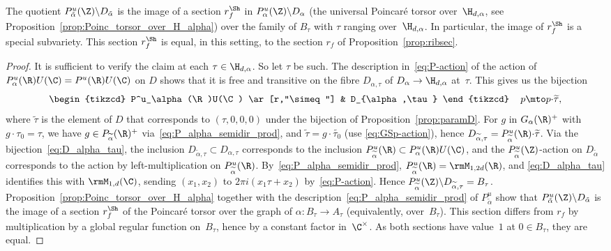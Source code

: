 \begin{Theorem}\label{thm:RibetsectionMSV}
The quotient $P_{\tilde{\alpha}}^u(\Z)\backslash D_{\tilde{\alpha}}$
is the image of a section $r^\Sh_f$ in $P_\alpha^u(\Z)\backslash
D_\alpha$ (the universal Poincaré torsor over~$\H_{d,\alpha}$, see
Proposition~\ref{prop:Poinc_torsor_over_H_alpha}) over the family of
$B_\tau$ with $\tau$ ranging over~$\H_{d,\alpha}$. In particular,
the image of $r^\Sh_f$ is a special subvariety. This section $r^\Sh_f$
is equal, in this setting, to the section $r_f$ of
Proposition~\ref{prop:ribsec}.
\end{Theorem}
\begin{proof}
It is sufficient to verify the claim at each
$\tau\in\H_{d,\alpha}$. So let $\tau$ be such. The description
in~\eqref{eq:P-action} of the action of
$P^u_\alpha(\R)U(\C)=P^u(\R)U(\C)$ on $D$ shows that it is free and
transitive on the fibre $D_{\alpha,\tau}$ of
$D_\alpha\to\H_{d,\alpha}$ at~$\tau$. This gives us the bijection
\begin{equation}\label{eq:D_alpha_tau}
\begin{tikzcd}
P^u_\alpha(\R)U(\C) \ar[r,"\simeq"] & D_{\alpha,\tau}
\end{tikzcd}\,\quad
p\mto p{\cdot}\widetilde{\tau},
\end{equation}
where $\widetilde{\tau}$ is the element of $D$ that corresponds to
$(\tau,0,0,0)$ under the bijection of Proposition~\ref{prop:paramD}.
For $g$ in $G_\alpha(\R)^+$ with $g{\cdot}\tau_0=\tau$, we have $g\in
P_{\widetilde{\alpha}}(\R)^+$ via~\eqref{eq:P_alpha_semidir_prod}, and
$\widetilde{\tau}=g{\cdot}\widetilde{\tau_0}$ (use
\eqref{eq:GSp-action}), hence
$D_{\widetilde{\alpha},\tau}=P^u_{\widetilde{\alpha}}(\R){\cdot}\widetilde{\tau}$.
Via the bijection~\eqref{eq:D_alpha_tau}, the inclusion
$D_{\widetilde{\alpha},\tau}\subset D_{\alpha,\tau}$ corresponds to
the inclusion $P^u_{\widetilde{\alpha}}(\R)\subset
P^u_\alpha(\R)U(\C)$, and the $P^u_{\widetilde{\alpha}}(\Z)$-action on
$D_{\tilde{\alpha}}$ corresponds to the action by left-multiplication
on $P^u_{\widetilde{\alpha}}(\R)$. By~\eqref{eq:P_alpha_semidir_prod},
$P^u_{\widetilde{\alpha}}(\R)=\rmM_{1,2d}(\R)$, and
\eqref{eq:D_alpha_tau} identifies this with $\rmM_{1,d}(\C)$, sending
$(x_1,x_2)$ to $2\pi i(x_1\tau + x_2)$ by~\eqref{eq:P-action}. Hence
$P_{\widetilde{\alpha}}^u(\Z)\backslash
D_{\widetilde{\alpha},\tau}=B_\tau$.
Proposition~\ref{prop:Poinc_torsor_over_H_alpha} together with the
description~\eqref{eq:P_alpha_semidir_prod} of
$P_{\widetilde{\alpha}}^u$ show that
$P_{\tilde{\alpha}}^u(\Z)\backslash D_{\tilde{\alpha}}$ is the image
of a section $r^\Sh_f$ of the Poincaré torsor over the graph of
$\alpha\colon B_\tau\to A_\tau$ (equivalently, over~$B_\tau$). This
section differs from $r_f$ by multiplication by a global regular
function on~$B_\tau$, hence by a constant factor in~$\C^\times$. As
both sections have value~$1$ at $0\in B_\tau$, they are equal.
\end{proof}

